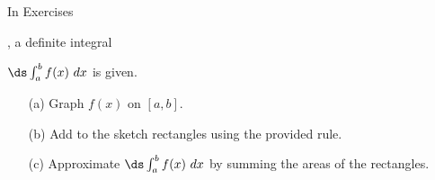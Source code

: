 {\noindent In Exercises}
{, a definite integral 

$\ds \int_a^b f(x) \ dx$ is given. 
\begin{enumerate}
\item[(a)]		Graph $f(x)$ on $[a,b]$.
\item[(b)]		Add to the sketch rectangles using the provided rule.
\item[(c)]		Approximate $\ds \int_a^b f(x) \ dx$ by summing the areas of the rectangles.
\end{enumerate}
}

